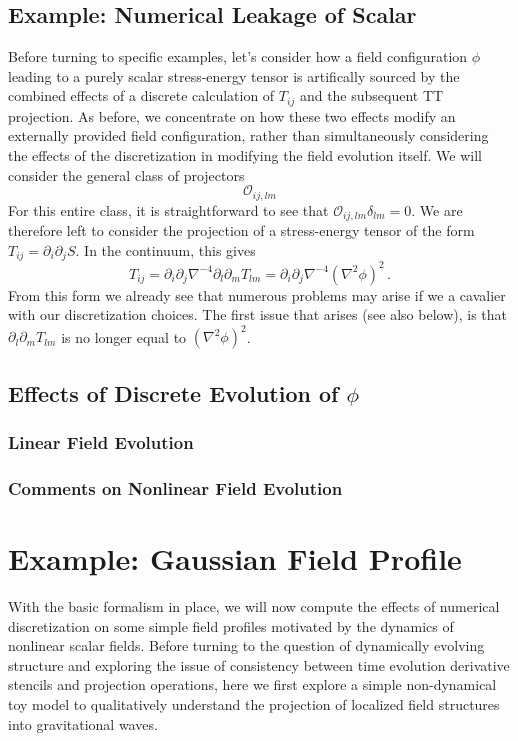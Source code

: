 \documentclass{revtex4}
\begin{document}
\subsection{Example: Numerical Leakage of Scalar}
Before turning to specific examples, let's consider how a field configuration $\phi$ leading to a purely scalar stress-energy tensor is artifically sourced by the combined effects of a discrete calculation of $T_{ij}$ and the subsequent TT projection.
As before, we concentrate on how these two effects modify an externally provided field configuration, rather than simultaneously considering the effects of the discretization in modifying the field evolution itself.
We will consider the general class of projectors
\begin{equation}
  \mathcal{O}_{ij,lm}
\end{equation}
For this entire class, it is straightforward to see that $\mathcal{O}_{ij,lm}\delta_{lm} = 0$.
We are therefore left to consider the projection of a stress-energy tensor of the form $T_{ij} = \partial_i\partial_jS$.
In the continuum, this gives
\begin{equation}
  T_{ij} = \partial_i\partial_j\nabla^{-4}\partial_l\partial_mT_{lm} = \partial_i\partial_j\nabla^{-4}(\nabla^2\phi)^2 \, .
\end{equation}
From this form we already see that numerous problems may arise if we a cavalier with our discretization choices.
The first issue that arises (see also below), is that $\partial_l\partial_mT_{lm}$ is no longer equal to $(\nabla^2\phi)^2$.

\subsection{Effects of Discrete Evolution of $\phi$}
\subsubsection{Linear Field Evolution}

\subsubsection{Comments on Nonlinear Field Evolution}

\section{Example: Gaussian Field Profile}
With the basic formalism in place, we will now compute the effects of numerical discretization on some simple field profiles motivated by the dynamics of nonlinear scalar fields.
Before turning to the question of dynamically evolving structure and exploring the issue of consistency between time evolution derivative stencils and projection operations,
here we first explore a simple non-dynamical toy model to qualitatively understand the projection of localized field structures into gravitational waves.
\end{document}
